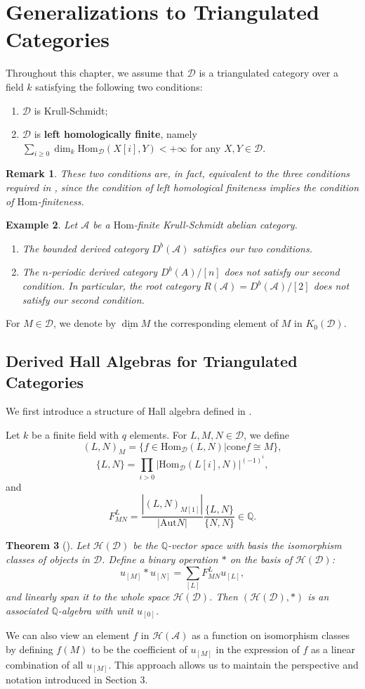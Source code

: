 \documentclass[a4paper,12pt]{amsart}
\newtheorem{theorem}{Theorem}[section]
\newtheorem{remark}[theorem]{Remark}
\newtheorem{example}[theorem]{Example}
\newcommand{\Aut}{\mathrm{Aut}}
\newcommand{\Hom}{\mathrm{Hom}}
\newcommand{\cone}{\mathrm{cone}}
\newcommand{\udv}{\underline{\dim}}
\begin{document}
\section{Generalizations to Triangulated Categories}
Throughout this chapter, we assume that $\mathcal{D}$ is a triangulated category over a field $k$ satisfying the following two conditions:
\begin{enumerate}
    \item $\mathcal{D}$ is Krull-Schmidt;
    \item $\mathcal{D}$ is \textbf{left homologically finite}, namely $\sum_{i\geqslant0}\dim_k\Hom_\mathcal{D}(X[i],Y)<+\infty$ for any $X,Y\in\mathcal{D}$.
\end{enumerate}
\begin{remark}
    These two conditions are, in fact, equivalent to the three conditions required in \cite{XX2006}, since the condition of left homological finiteness implies the condition of $\Hom$-finiteness.
\end{remark}
\begin{example} Let $\mathcal{A}$ be a $\Hom$-finite Krull-Schmidt abelian category.
    \begin{enumerate}
        \item The bounded derived category $D^b(\mathcal{A})$ satisfies our two conditions.
        \item The $n$-periodic derived category $D^b(A)/[n]$ does not satisfy our second condition. In particular, the root category $R(\mathcal{A})=D^b(\mathcal{A})/[2]$ does not satisfy our second condition.
    \end{enumerate}
\end{example}
For $M\in\mathcal{D}$, we denote by $\udv M$ the corresponding element of $M$ in $K_0(\mathcal{D})$.
\subsection{Derived Hall Algebras for Triangulated Categories}
We first introduce a structure of Hall algebra defined in \cite{XX2006}.

Let $k$ be a finite field with $q$ elements. For $L,M,N\in\mathcal{D}$, we define
\[(L,N)_M=\{f\in\Hom_\mathcal{D}(L,N)|\cone f\cong M\},\]
\[\{L,N\}=\prod_{i>0}|\Hom_{\mathcal{D}}(L[i],N)|^{(-1)^i},\]
and
\[F_{MN}^L=\frac{|(L,N)_{M[1]}|}{|\Aut N|}\frac{\{L,N\}}{\{N,N\}}\in\mathbb{Q}.\]
\begin{theorem}[\cite{XX2006}]
    Let $\mathcal{H}(\mathcal{D})$ be the $\mathbb{Q}$-vector space with basis the isomorphism classes of objects in $\mathcal{D}$. Define a binary operation $*$ on the basis of $\mathcal{H}(\mathcal{D})$:
    \[u_{[M]}*u_{[N]}=\sum_{[L]}F_{MN}^Lu_{[L]},\]
    and linearly span it to the whole space $\mathcal{H}(\mathcal{D})$. Then $(\mathcal{H}(\mathcal{D}),*)$ is an associated $\mathbb{Q}$-algebra with unit $u_{[0]}$.
\end{theorem}
We can also view an element $f$ in $\mathcal{H}(\mathcal{A})$ as a function on isomorphism classes by defining $f(M)$ to be the coefficient of $u_{[M]}$ in the expression of $f$ as a linear combination of all $u_{[M]}$. This approach allows us to maintain the perspective and notation introduced in Section 3.
\end{document}
